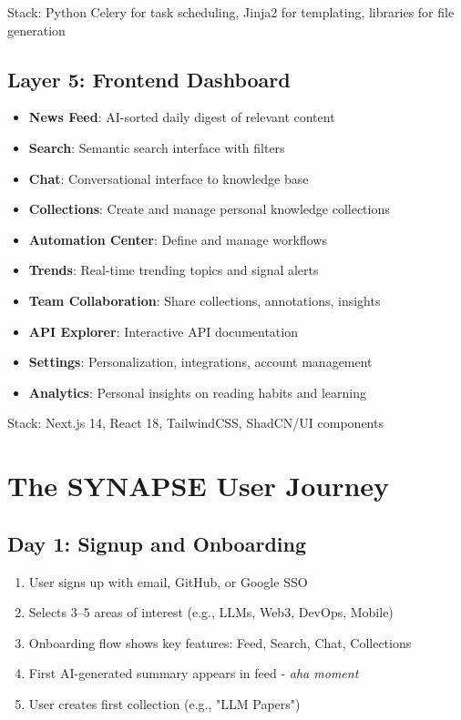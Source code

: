 \documentclass{report}
\begin{document}
Stack: Python Celery for task scheduling, Jinja2 for templating, libraries for file generation

\subsection{Layer 5: Frontend Dashboard}

\begin{itemize}
    \item \textbf{News Feed}: AI-sorted daily digest of relevant content
    \item \textbf{Search}: Semantic search interface with filters
    \item \textbf{Chat}: Conversational interface to knowledge base
    \item \textbf{Collections}: Create and manage personal knowledge collections
    \item \textbf{Automation Center}: Define and manage workflows
    \item \textbf{Trends}: Real-time trending topics and signal alerts
    \item \textbf{Team Collaboration}: Share collections, annotations, insights
    \item \textbf{API Explorer}: Interactive API documentation
    \item \textbf{Settings}: Personalization, integrations, account management
    \item \textbf{Analytics}: Personal insights on reading habits and learning
\end{itemize}

Stack: Next.js 14, React 18, TailwindCSS, ShadCN/UI components

\section{The SYNAPSE User Journey}

\subsection{Day 1: Signup and Onboarding}

\begin{enumerate}
    \item User signs up with email, GitHub, or Google SSO
    \item Selects 3--5 areas of interest (e.g., LLMs, Web3, DevOps, Mobile)
    \item Onboarding flow shows key features: Feed, Search, Chat, Collections
    \item First AI-generated summary appears in feed - \textit{aha moment}
    \item User creates first collection (e.g., "LLM Papers")
\end{enumerate}
\end{document}
